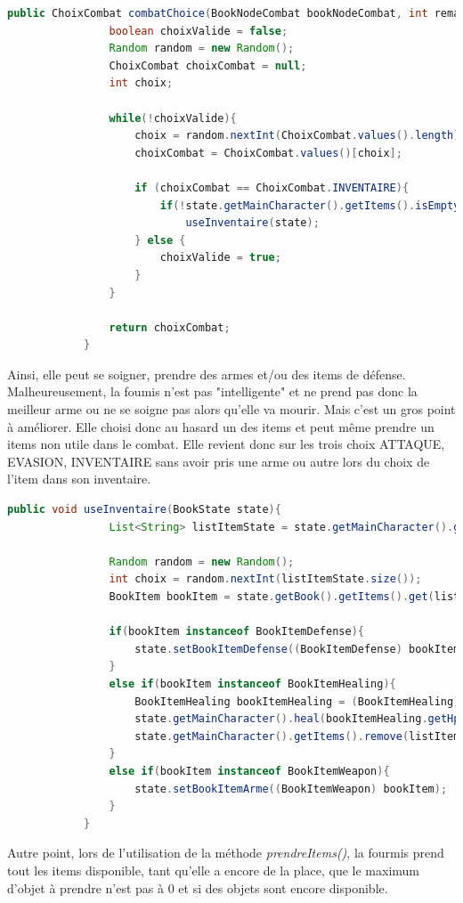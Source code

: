 		\begin{lstlisting}[gobble=12, language=java, label=combatChoiceFourmis, caption=combatChoice() de Fourmis]
			public ChoixCombat combatChoice(BookNodeCombat bookNodeCombat, int remainingRoundBeforeEvasion, BookState state) {
				boolean choixValide = false;
				Random random = new Random();
				ChoixCombat choixCombat = null;
				int choix;

				while(!choixValide){
					choix = random.nextInt(ChoixCombat.values().length);
					choixCombat = ChoixCombat.values()[choix];

					if (choixCombat == ChoixCombat.INVENTAIRE){
						if(!state.getMainCharacter().getItems().isEmpty())
							useInventaire(state);
					} else {
						choixValide = true;
					}
				}

				return choixCombat;
			}
		\end{lstlisting}

		 Ainsi, elle peut se soigner, prendre des armes et/ou des items de défense. Malheureusement, la foumis n'est pas "intelligente" et ne prend pas donc la meilleur arme ou ne se soigne pas alors qu'elle va mourir. Mais c'est un gros point à améliorer. Elle choisi donc au hasard un des items et peut même prendre un items non utile dans le combat. Elle revient donc sur les trois choix ATTAQUE, EVASION, INVENTAIRE sans avoir pris une arme ou autre lors du choix de l'item dans son inventaire.

		\begin{lstlisting}[gobble=12, language=java, label=useInventaireFourmis, caption=combatChoice() de Fourmis]
			public void useInventaire(BookState state){
				List<String> listItemState = state.getMainCharacter().getItems();

				Random random = new Random();
				int choix = random.nextInt(listItemState.size());
				BookItem bookItem = state.getBook().getItems().get(listItemState.get(choix));

				if(bookItem instanceof BookItemDefense){
					state.setBookItemDefense((BookItemDefense) bookItem);
				}
				else if(bookItem instanceof BookItemHealing){
					BookItemHealing bookItemHealing = (BookItemHealing) bookItem;
					state.getMainCharacter().heal(bookItemHealing.getHp());
					state.getMainCharacter().getItems().remove(listItemState.get(choix));
				}
				else if(bookItem instanceof BookItemWeapon){
					state.setBookItemArme((BookItemWeapon) bookItem);
				}
			}
		\end{lstlisting}

		Autre point, lors de l'utilisation de la méthode \textit{prendreItems()}, la fourmis prend tout les items disponible, tant qu'elle a encore de la place, que le maximum d'objet à prendre n'est pas à 0 et si des objets sont encore disponible.

